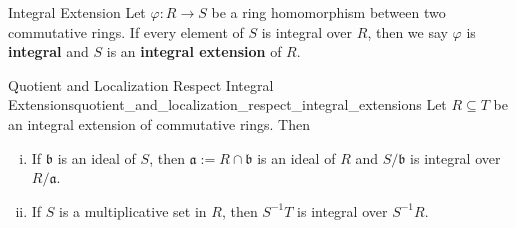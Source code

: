 \begin{definition}{Integral Extension}{}
    Let $\varphi:R\to S$ be a ring homomorphism between two commutative rings. If every element of $S$ is integral over $R$, then we say $\varphi$ is \textbf{integral} and $S$ is an \textbf{integral extension} of $R$.
\end{definition}

\begin{proposition}{Quotient and Localization Respect Integral Extensions}{quotient_and_localization_respect_integral_extensions}
    Let $R\subseteq T$ be an integral extension of commutative rings. Then 
    \begin{enumerate}[(i)]
        \item If $\mathfrak{b}$ is an ideal of $S$, then $\mathfrak{a}:= R\cap \mathfrak{b}$ is an ideal of $R$ and $S/\mathfrak{b}$ is integral over $R/\mathfrak{a}$.
        \item If $S$ is a multiplicative set in $R$, then $S^{-1}T$ is integral over $S^{-1}R$.
    \end{enumerate}
\end{proposition}
